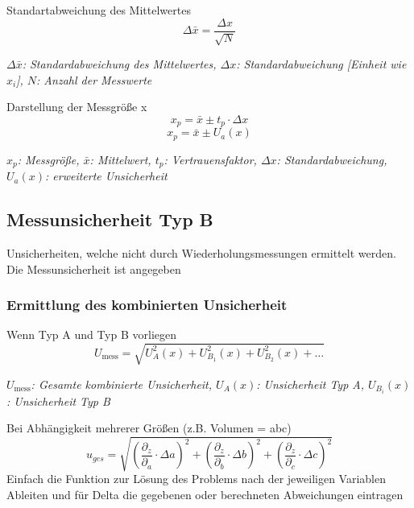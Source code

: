 \documentclass[a4paper,10pt]{article}
\newenvironment{displayformula}
{
	\begin{framed}
		\color{formulaColor}
	}
	{\end{framed}}
\newcommand{\formulalegend}[1]{%
	\par\vspace{0.5ex}%
	{{\color{legendColor}\RaggedRight\small\textit{#1}}}%
	\par\vspace{1.5ex}%
}
\begin{document}
	\begin{displayformula}
		Standartabweichung des Mittelwertes
		\[
		\Delta \bar{x} = \frac{\Delta x}{\sqrt{N}} 
		\]	
	\end{displayformula}
	\formulalegend{
		\( \Delta \bar{x} \): Standardabweichung des Mittelwertes, \( \Delta x \): Standardabweichung [Einheit wie \( x_i \)], \( N \): Anzahl der Messwerte
	}
	
	\begin{displayformula}
		Darstellung der Messgröße x
		\[
		x_p = \bar{x} \pm t_p \cdot \Delta x
		\]
		\[
		x_p = \bar{x} \pm U_a (x)
		\]
	\end{displayformula}
	\formulalegend{
		\( x_p \): Messgröße, \( \bar{x} \): Mittelwert, \( t_p \): Vertrauensfaktor, \( \Delta x \): Standardabweichung, \( U_a(x) \): erweiterte Unsicherheit
	}
	
	\newpage
	
	\subsection{Messunsicherheit Typ B}
	\begin{displayformula}
		Unsicherheiten, welche nicht durch Wiederholungsmessungen ermittelt werden. \\ Die Messunsicherheit ist angegeben
	\end{displayformula}
	
	\subsubsection{Ermittlung des kombinierten Unsicherheit}
	
	\begin{displayformula}
		Wenn Typ A und Typ B vorliegen
		\[
		U_\text{mess} = \sqrt{U^2_A(x) + U^2_{B_1}(x) + U^2_{B_2}(x) + \dots}
		\]
	\end{displayformula}
	\formulalegend{
		\( U_\text{mess} \): Gesamte kombinierte Unsicherheit, \( U_A(x) \): Unsicherheit Typ A, \( U_{B_i}(x) \): Unsicherheit Typ B
	}
	
	\begin{displayformula}
		Bei Abhängigkeit mehrerer Größen (z.B. Volumen = abc)
		\[
		u_{ges} = \sqrt{(\frac{\partial_z}{\partial_a} \cdot \Delta a)^2 + (\frac{\partial_z}{\partial_b} \cdot \Delta b)^2 + (\frac{\partial_z}{\partial_c} \cdot \Delta c)^2 }
		\]
		Einfach die Funktion zur Lösung des Problems nach der jeweiligen Variablen Ableiten und für Delta die gegebenen oder berechneten Abweichungen eintragen
	\end{displayformula}
	
\end{document}
